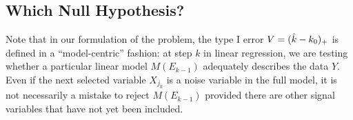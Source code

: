 \documentclass{article}
\begin{document}

\subsection{Which Null Hypothesis?}
\label{sec:whichnull}

Note that in our formulation of the problem, the type I error $V=(\hat{k}-k_0)_+$ is defined in a ``model-centric'' fashion: at step $k$ in linear regression, we are testing  whether a particular linear model $M(E_{k-1})$ adequately describes the data $Y$. Even if the next selected variable $X_{j_k}$ is a noise variable in the full model, it is not necessarily a mistake to reject $M(E_{k-1})$ provided there are other signal variables that have not yet been included.
\end{document}
